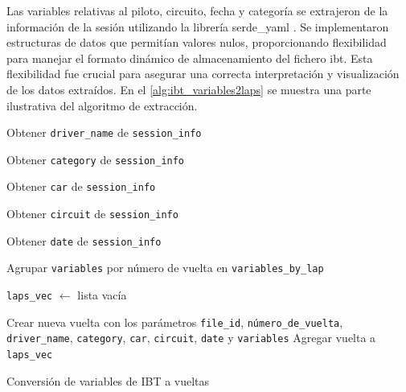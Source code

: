 Las variables relativas al piloto, circuito, fecha y categoría se extrajeron de la información de la sesión utilizando la librería serde\_yaml \cite{serde_yaml}. Se implementaron estructuras de datos que permitían valores nulos, proporcionando flexibilidad para manejar el formato dinámico de almacenamiento del fichero \ac{ibt}. Esta flexibilidad fue crucial para asegurar una correcta interpretación y visualización de los datos extraídos. En el \autoref{alg:ibt_variables2laps} se muestra una parte ilustrativa del algoritmo de extracción.

\IncMargin{1em}
\begin{algorithm}[H]
\LinesNumbered
\SetAlgoLined



 {
    Obtener \texttt{driver\_name} de \texttt{session\_info}\;
    
    Obtener \texttt{category} de \texttt{session\_info}\;

    Obtener \texttt{car} de \texttt{session\_info}\;

    Obtener \texttt{circuit} de \texttt{session\_info}\;

    Obtener \texttt{date} de \texttt{session\_info}\;

    Agrupar \texttt{variables} por número de vuelta en \texttt{variables\_by\_lap}\;

    \texttt{laps\_vec} $\leftarrow$ lista vacía\;

     {
        Crear nueva vuelta con los parámetros \texttt{file\_id}, \texttt{número\_de\_vuelta}, \texttt{driver\_name}, \texttt{category}, \texttt{car}, \texttt{circuit}, \texttt{date} y \texttt{variables}\;
        Agregar vuelta a \texttt{laps\_vec}\;
    }

    \;
}
\caption{Conversión de variables de IBT a vueltas}\label{alg:ibt_variables2laps}
\end{algorithm}
\DecMargin{1em}



